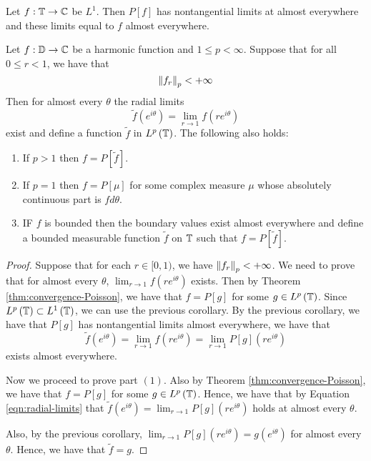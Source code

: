 \begin{corollary}
    Let $f : \mathbb T \to \mathbb C$ be $L^{1}$. Then $P[f]$ has nontangential limits at almost everywhere and these limits equal to $f$ almost everywhere.
    \label{cor:L1-implies-Poisson-limits}
\end{corollary}

\begin{corollary}
    Let $f: \mathbb D \to \mathbb C$ be a harmonic function and $1\le p <\infty$. Suppose that for all $0\le r < 1$, we have that
    \begin{equation*}
	\left\lVert f_{r} \right\rVert_{p} < +\infty
    \end{equation*}
    Then for almost every $\theta$ the radial limits 
    \begin{equation*}
	\tilde {f} (e^{i\theta} ) = \lim_{r\to 1} f\left( re^{i\theta} \right)
    \end{equation*}
    exist and define a function $\tilde f$ in $L^{p} \left( \mathbb T \right)$. The following also holds:
    \begin{enumerate}
	\item If $p>1$ then $f=P[\tilde{f}]$.
	\item If $p=1$ then $f=P[\mu]$ for some complex measure $\mu$ whose absolutely continuous part is $fd\theta$.
	\item IF $f$ is bounded then the boundary values exist almost everywhere and define a bounded measurable function $\tilde{f}$ on $\mathbb T$ such that $f=P[\tilde{f}]$.
    \end{enumerate}
    \label{cor:imp-Fatou}
\end{corollary}
\begin{proof}
    Suppose that for each $r\in [0,1)$, we have $\left\lVert f_{r} \right\rVert_{p} < +\infty$. We need to prove that for almost every $\theta$, $\lim_{r\to 1} f\left( re^{i\theta} \right)$ exists. Then by Theorem \ref{thm:convergence-Poisson}, we have that $f=P[g]$ for some $g\in L^{p} \left( \mathbb T \right)$. Since $L^{p} \left( \mathbb T \right) \subset L^{1} \left( \mathbb T \right)$, we can use the previous corollary. By the previous corollary, we have that $P[g]$ has nontangential limits almost everywhere, we have that
    \begin{equation}
	\tilde{f} \left( e^{i\theta} \right) = \lim_{r\to 1} f(re^{i\theta}) = \lim_{r\to 1} P[g] \left( re^{i\theta} \right)
	\label{eqn:radial-limits}
    \end{equation}
    exists almost everywhere.

    Now we proceed to prove part $(1)$. Also by Theorem \ref{thm:convergence-Poisson}, we have that $f=P[g]$ for some $g\in L^{p} \left( \mathbb T \right)$. Hence, we have that by Equation \ref{eqn:radial-limits} that $\tilde{f} (e^{i\theta}) =  \lim_{r\to 1} P[g] \left( re^{i\theta} \right)$ holds at almost every $\theta$.

    Also, by the previous corollary, $\lim_{r\to 1} P[g] \left( re^{i\theta} \right) = g(e^{i\theta})$ for almost every $\theta$. Hence, we have that $\tilde{f} = g$.

\end{proof}

